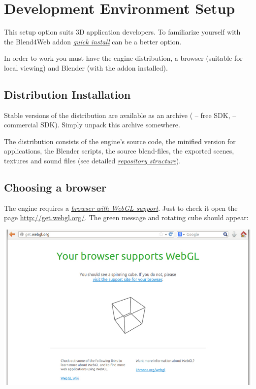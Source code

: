\documentclass[a4paper,12pt,oneside]{sphinxmanual}
\begin{document}
\begin{DUlineblock}{0em}
\item[] 
\end{DUlineblock}


\chapter{Development Environment Setup}
\label{setup:setup}\label{setup::doc}\label{setup:id1}
This setup option suits 3D application developers. To familiarize yourself with the Blend4Web addon {\hyperref[first_steps:quick-install]{\emph{quick install}}} can be a better option.

In order to work you must have the engine distribution, a browser (suitable for local viewing) and Blender (with the addon installed).


\section{Distribution Installation}
\label{setup:getting-started-distribution}\label{setup:id2}
Stable versions of the distribution are available as an archive ( -- free SDK,  -- commercial SDK). Simply unpack this archive somewhere.

The distribution consists of the engine's source code, the minified version for applications, the Blender scripts, the source blend-files, the exported scenes, textures and sound files (see detailed {\hyperref[developers_advanced:repo-file-structure]{\emph{repository structure}}}).


\section{Choosing a browser}
\label{setup:index-0}\label{setup:getting-started-browser}\label{setup:id3}
The engine requires a {\hyperref[about:browser-webgl-support]{\emph{browser with WebGL support}}}. Just to check it open the page \href{http://get.webgl.org/}{http://get.webgl.org/}. The green message and rotating cube should appear:

{\hfill\includegraphics[width=1.000\linewidth]{browser_supports_webgl.jpg}\hfill}
\end{document}
